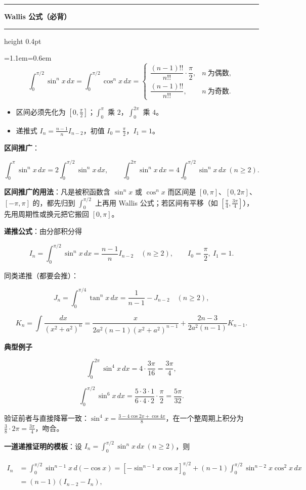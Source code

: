 \documentclass[11pt,openany,UTF8]{ctexbook}
\newcommand{\callouthead}[2]{%
  \par\addvspace{7pt}\noindent
  {\color{#1}\rule[-0.15em]{3pt}{1.05em}}\hspace{0.5em}%
  {\bfseries\color{#1}#2}\par\nobreak\vspace{-0.35em}%
  {\color{rulesep}\hrule height 0.4pt}\nobreak\vspace{0.45em}%
  \begingroup\small\setlength{\parindent}{0pt}%
  \leftskip=1.1em\rightskip=0.6em\noindent\ignorespaces}
\newcommand{\calloutend}{\par\endgroup\addvspace{7pt}}
\newenvironment{callkey}[1]{\callouthead{keybar}{#1}}{\calloutend}
\begin{document}
\begin{callkey}{Wallis 公式（必背）}
\[\int_0^{\pi/2}\sin^nx\,dx=\int_0^{\pi/2}\cos^nx\,dx=\begin{cases}\dfrac{(n-1)!!}{n!!}\cdot\dfrac{\pi}{2}, & n\ \text{为偶数},\\[2mm]\dfrac{(n-1)!!}{n!!}, & n\ \text{为奇数}.\end{cases}\]

\begin{itemize}
\item 区间必须先化为 $\left[0,\frac{\pi}{2}\right]$；$\int_0^{\pi}$ 乘 $2$，$\int_0^{2\pi}$ 乘 $4$。
\item 递推式 $I_n=\frac{n-1}{n}I_{n-2}$，初值 $I_0=\frac{\pi}{2}$，$I_1=1$。
\end{itemize}
\end{callkey}

\textbf{区间推广}：

\[\int_0^{\pi}\sin^nx\,dx=2\int_0^{\pi/2}\sin^nx\,dx,\qquad \int_0^{2\pi}\sin^nx\,dx=4\int_0^{\pi/2}\sin^nx\,dx\ (n\geq2).\]

\textbf{区间推广的用法}：凡是被积函数含 $\sin^nx$ 或 $\cos^nx$ 而区间是 $[0,\pi]$、$[0,2\pi]$、$[-\pi,\pi]$ 的，都先归到 $\int_0^{\pi/2}$ 上再用 Wallis 公式；若区间有平移（如 $\left[\frac{\pi}{4},\frac{3\pi}{4}\right]$），先用周期性或换元把它搬回 $[0,\pi]$。

\textbf{递推公式}：由分部积分得

\[I_n=\int_0^{\pi/2}\sin^nx\,dx=\frac{n-1}{n}I_{n-2}\quad(n\geq2),\qquad I_0=\frac{\pi}{2},\ I_1=1.\]

同类递推（都要会推）：

\[J_n=\int_0^{\pi/4}\tan^nx\,dx=\frac{1}{n-1}-J_{n-2}\quad(n\geq2),\]

\[K_n=\int\frac{dx}{\left(x^2+a^2\right)^n}=\frac{x}{2a^2(n-1)\left(x^2+a^2\right)^{n-1}}+\frac{2n-3}{2a^2(n-1)}K_{n-1}.\]

\textbf{典型例子}

\[\int_0^{2\pi}\sin^4x\,dx=4\cdot\frac{3\pi}{16}=\frac{3\pi}{4},\]

\[\int_0^{\pi/2}\sin^6x\,dx=\frac{5\cdot3\cdot1}{6\cdot4\cdot2}\cdot\frac{\pi}{2}=\frac{5\pi}{32}.\]

验证前者与直接降幂一致：$\sin^4x=\frac{3-4\cos2x+\cos4x}{8}$，在一个整周期上积分为 $\frac{3}{8}\cdot2\pi=\frac{3\pi}{4}$，吻合。

\textbf{一道递推证明的模板}：设 $I_n=\int_0^{\pi/2}\sin^nx\,dx\ (n\geq2)$，则

\[\begin{aligned}
I_n&=\int_0^{\pi/2}\sin^{n-1}x\,d(-\cos x)
=\left[-\sin^{n-1}x\cos x\right]_0^{\pi/2}+(n-1)\int_0^{\pi/2}\sin^{n-2}x\cos^2x\,dx\\
&=(n-1)\left(I_{n-2}-I_n\right),
\end{aligned}\]
\end{document}
